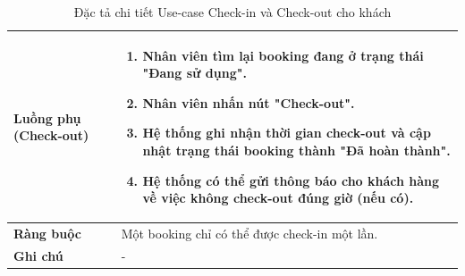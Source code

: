 \begin{table}[H]
\begin{tabular}{|p{4cm}|p{10cm}|}
\textbf{Luồng phụ (Check-out)}
&
\begin{enumerate}
    \item Nhân viên tìm lại booking đang ở trạng thái "Đang sử dụng".
    \item Nhân viên nhấn nút "Check-out".
    \item Hệ thống ghi nhận thời gian check-out và cập nhật trạng thái booking thành "Đã hoàn thành".
    \item Hệ thống có thể gửi thông báo cho khách hàng về việc không check-out đúng giờ (nếu có).
\end{enumerate} \\
\hline

\textbf{Ràng buộc} 
& Một booking chỉ có thể được check-in một lần. \\ 
\hline

\textbf{Ghi chú} 
& - \\ 
\hline
\end{tabular}
\caption{Đặc tả chi tiết Use-case Check-in và Check-out cho khách}
\label{tab:checkin-spec}
\end{table}


